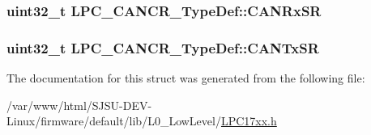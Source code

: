 \subsubsection[{\texorpdfstring{C\+A\+N\+Rx\+SR}{CANRxSR}}]{ uint32\+\_\+t L\+P\+C\+\_\+\+C\+A\+N\+C\+R\+\_\+\+Type\+Def\+::\+C\+A\+N\+Rx\+SR}\hypertarget{structLPC__CANCR__TypeDef_abd917011d5f82b5f4f14d4a5d34581b5}{}\label{structLPC__CANCR__TypeDef_abd917011d5f82b5f4f14d4a5d34581b5}
\subsubsection[{\texorpdfstring{C\+A\+N\+Tx\+SR}{CANTxSR}}]{ uint32\+\_\+t L\+P\+C\+\_\+\+C\+A\+N\+C\+R\+\_\+\+Type\+Def\+::\+C\+A\+N\+Tx\+SR}\hypertarget{structLPC__CANCR__TypeDef_a8b38016c4e2b002c08b429c1c5782d74}{}\label{structLPC__CANCR__TypeDef_a8b38016c4e2b002c08b429c1c5782d74}


The documentation for this struct was generated from the following file\+:\begin{DoxyCompactItemize}
\item 
/var/www/html/\+S\+J\+S\+U-\/\+D\+E\+V-\/\+Linux/firmware/default/lib/\+L0\+\_\+\+Low\+Level/\hyperlink{LPC17xx_8h}{L\+P\+C17xx.\+h}\end{DoxyCompactItemize}

